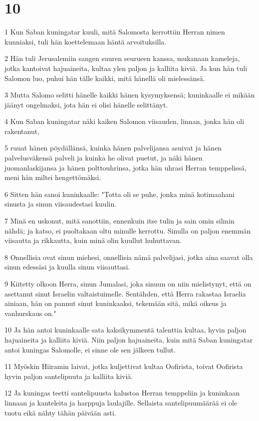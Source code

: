 \chapter{10}

\par 1 Kun Saban kuningatar kuuli, mitä Salomosta kerrottiin Herran nimen kunniaksi, tuli hän koettelemaan häntä arvoituksilla.
\par 2 Hän tuli Jerusalemiin sangen suuren seurueen kanssa, mukanaan kameleja, jotka kantoivat hajuaineita, kultaa ylen paljon ja kalliita kiviä. Ja kun hän tuli Salomon luo, puhui hän tälle kaikki, mitä hänellä oli mielessänsä.
\par 3 Mutta Salomo selitti hänelle kaikki hänen kysymyksensä; kuninkaalle ei mikään jäänyt ongelmaksi, jota hän ei olisi hänelle selittänyt.
\par 4 Kun Saban kuningatar näki kaiken Salomon viisauden, linnan, jonka hän oli rakentanut,
\par 5 ruuat hänen pöydällänsä, kuinka hänen palvelijansa asuivat ja hänen palvelusväkensä palveli ja kuinka he olivat puetut, ja näki hänen juomanlaskijansa ja hänen polttouhrinsa, jotka hän uhrasi Herran temppelissä, meni hän miltei hengettömäksi.
\par 6 Sitten hän sanoi kuninkaalle: "Totta oli se puhe, jonka minä kotimaahani sinusta ja sinun viisaudestasi kuulin.
\par 7 Minä en uskonut, mitä sanottiin, ennenkuin itse tulin ja sain omin silmin nähdä; ja katso, ei puoltakaan oltu minulle kerrottu. Sinulla on paljon enemmän viisautta ja rikkautta, kuin minä olin kuullut huhuttavan.
\par 8 Onnellisia ovat sinun miehesi, onnellisia nämä palvelijasi, jotka aina saavat olla sinun edessäsi ja kuulla sinun viisauttasi.
\par 9 Kiitetty olkoon Herra, sinun Jumalasi, joka sinuun on niin mielistynyt, että on asettanut sinut Israelin valtaistuimelle. Sentähden, että Herra rakastaa Israelia ainiaan, hän on pannut sinut kuninkaaksi, tekemään sitä, mikä oikeus ja vanhurskaus on."
\par 10 Ja hän antoi kuninkaalle sata kaksikymmentä talenttia kultaa, hyvin paljon hajuaineita ja kalliita kiviä. Niin paljon hajuaineita, kuin mitä Saban kuningatar antoi kuningas Salomolle, ei sinne ole sen jälkeen tullut.
\par 11 Myöskin Hiiramin laivat, jotka kuljettivat kultaa Oofirista, toivat Oofirista hyvin paljon santelipuuta ja kalliita kiviä.
\par 12 Ja kuningas teetti santelipuusta kalustoa Herran temppeliin ja kuninkaan linnaan ja kanteleita ja harppuja laulajille. Sellaista santelipuumäärää ei ole tuotu eikä nähty tähän päivään asti.
